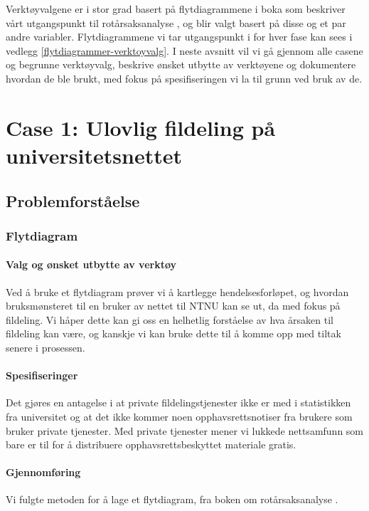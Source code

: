 Verktøyvalgene er i stor grad basert på flytdiagrammene i boka som beskriver vårt utgangspunkt til rotårsaksanalyse \cite{RCA}, og blir valgt basert på disse og et par andre variabler. Flytdiagrammene vi tar utgangspunkt i for hver fase kan sees i vedlegg \ref{flytdiagrammer-verktoyvalg}. I neste avsnitt vil vi gå gjennom alle casene og begrunne verktøyvalg, beskrive ønsket utbytte av verktøyene og dokumentere hvordan de ble brukt, med fokus på spesifiseringen vi la til grunn ved bruk av de. 

\section{Case 1: Ulovlig fildeling på universitetsnettet}

\subsection{Problemforståelse}

\subsubsection{Flytdiagram}

\paragraph{Valg og ønsket utbytte av verktøy}
Ved å bruke et flytdiagram prøver vi å kartlegge hendelsesforløpet, og hvordan bruksmønsteret til en bruker av nettet til NTNU kan se ut, da med fokus på fildeling. Vi håper dette kan gi oss en helhetlig forståelse av hva årsaken til fildeling kan være, og kanskje vi kan bruke dette til å komme opp med tiltak senere i prosessen. 

\paragraph{Spesifiseringer}
Det gjøres en antagelse i at private fildelingstjenester ikke er med i statistikken fra universitet og at det ikke kommer noen opphavsrettsnotiser fra brukere som bruker private tjenester. Med private tjenester mener vi lukkede nettsamfunn som bare er til for å distribuere opphavsrettsbeskyttet materiale gratis.

\paragraph{Gjennomføring}
Vi fulgte metoden for å lage et flytdiagram, fra boken om rotårsaksanalyse \cite{RCA}.


